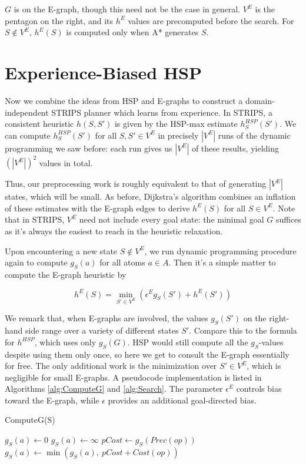 \documentclass[letterpaper]{article}
\begin{document}
$G$ is on the E-graph, though this need not be the case in general. $V^E$ is the pentagon on the right, and its $h^E$ values are precomputed before the search. For $S\notin V^E$, $h^E(S)$ is computed only when A* generates $S$.

\section{Experience-Biased HSP}

Now we combine the ideas from HSP and E-graphs to construct a domain-independent STRIPS planner which learns from experience. In STRIPS, a consistent heuristic $h(S,S')$ is given by the HSP-max estimate $h^{HSP}_S(S')$. We can compute $h^{HSP}_S(S')$ for all $S,S'\in V^E$ in precisely $|V^E|$ runs of the dynamic programming we saw before: each run gives us $|V^E|$ of these results, yielding $(|V^E|)^2$ values in total.

Thus, our preprocessing work is roughly equivalent to that of generating $|V^E|$ states, which will be small. As before, Dijkstra's algorithm combines an inflation of these estimates with the E-graph edges to derive $h^E(S)$ for all $S\in V^E$. Note that in STRIPS, $V^E$ need not include every goal state: the minimal goal $G$ suffices as it's always the easiest to reach in the heuristic relaxation.

Upon encountering a new state $S\notin V^E$, we run dynamic programming procedure again to compute $g_S(a)$ for all atoms $a\in A$. Then it's a simple matter to compute the E-graph heuristic by

\[h^E(S) = \min_{S'\in V^E} \left( \epsilon^E g_S(S') + h^E(S') \right)\]

We remark that, when E-graphs are involved, the values $g_S(S')$ on the right-hand side range over a variety of different states $S'$. Compare this to the formula for $h^{HSP}$, which uses only $g_S(G)$. HSP would still compute all the $g_S$-values despite using them only once, so here we get to consult the E-graph essentially for free. The only additional work is the minimization over $S'\in V^E$, which is negligible for small E-graphs. A pseudocode implementation is listed in Algorithms \ref{alg:ComputeG} and \ref{alg:Search}. The parameter $\epsilon^E$ controls bias toward the E-graph, while $\epsilon$ provides an additional goal-directed bias.

\begin{algorithm}
\caption{ComputeG(S)}
\label{alg:ComputeG}
\begin{algorithmic}
\STATE $g_S(a) \leftarrow 0$
\ELSE
\STATE $g_S(a) \leftarrow \infty$
\ENDIF
\ENDFOR
\REPEAT
{}
\STATE $pCost \leftarrow g_S(Prec(op))$
\STATE $g_S(a) \leftarrow \min \left(g_S(a),~pCost + Cost(op)\right)$
\ENDFOR
\ENDFOR
{}
\end{algorithmic}
\end{algorithm}
\end{document}
